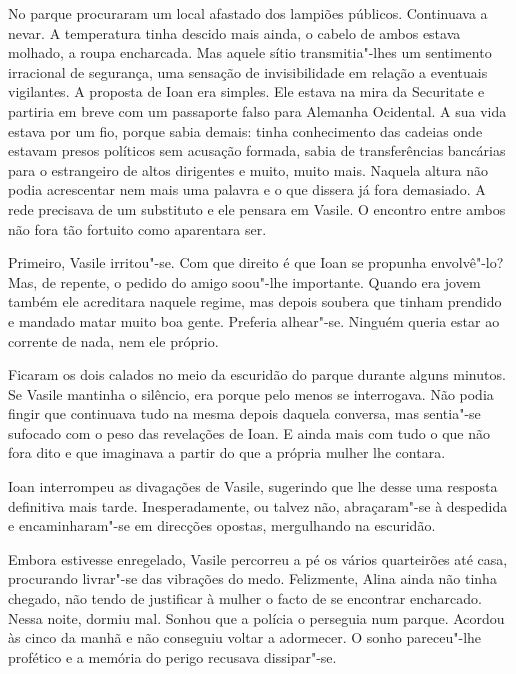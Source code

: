 No parque procuraram um local afastado dos lampiões públicos. Continuava
a nevar. A temperatura tinha descido mais ainda, o cabelo de ambos
estava molhado, a roupa encharcada. Mas aquele sítio transmitia"-lhes um
sentimento irracional de segurança, uma sensação de invisibilidade
em relação a eventuais vigilantes. A proposta de Ioan era simples. Ele
estava na mira da Securitate e partiria em breve com um passaporte falso
para Alemanha Ocidental. A sua vida estava por um fio, porque sabia
demais: tinha conhecimento das cadeias onde estavam presos políticos sem
acusação formada, sabia de transferências bancárias para o estrangeiro
de altos dirigentes e muito, muito mais. Naquela altura não podia
acrescentar nem mais uma palavra e o que dissera já fora demasiado. A
rede precisava de um substituto e ele pensara em Vasile. O encontro
entre ambos não fora tão fortuito como aparentara ser.

Primeiro, Vasile irritou"-se. Com que direito é que Ioan se propunha
envolvê"-lo? Mas, de repente, o pedido do amigo soou"-lhe importante.
Quando era jovem também ele acreditara naquele regime, mas depois
soubera que tinham prendido e mandado matar muito boa gente. Preferia
alhear"-se. Ninguém queria estar ao corrente de nada, nem ele próprio.

Ficaram os dois calados no meio da escuridão do parque durante alguns
minutos. Se Vasile mantinha o silêncio, era porque pelo menos se
interrogava. Não podia fingir
que continuava tudo na mesma depois daquela conversa, mas sentia"-se
sufocado com o peso das revelações de Ioan. E ainda mais com tudo o que
não fora dito e que imaginava a partir do que a própria mulher lhe
contara.

Ioan interrompeu as divagações de Vasile, sugerindo que lhe desse uma
resposta definitiva mais tarde. Inesperadamente, ou talvez não,
abraçaram"-se à despedida e encaminharam"-se em direcções opostas,
mergulhando na escuridão.

Embora estivesse enregelado, Vasile percorreu a pé os vários quarteirões
até casa, procurando livrar"-se das vibrações do medo. Felizmente,
Alina ainda não tinha chegado, não tendo de justificar à mulher o facto
de se encontrar encharcado. Nessa noite, dormiu mal. Sonhou que a polícia o perseguia num parque. Acordou às cinco da manhã e não conseguiu
voltar a adormecer. O sonho pareceu"-lhe profético e a memória do perigo
recusava dissipar"-se.

